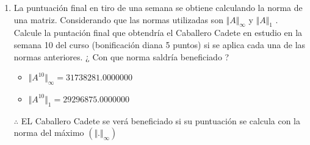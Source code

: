 \documentclass[10pt,a4paper]{article}
\begin{document}
\begin{enumerate}
	
	\item La puntuación final en tiro de una semana se obtiene calculando la norma de una matriz. Considerando que las normas utilizadas son $\Vert A\Vert_{\infty}$ y $\Vert A\Vert_{1}$ . Calcule la puntación final que obtendría el Caballero Cadete en estudio en la semana 10 del curso (bonificación diana 5 puntos) si se aplica cada una de las normas anteriores. ¿ Con que norma saldría beneficiado ?
		\begin{itemize}
			\item $\Vert A^{10}\Vert_{\infty} = 31738281.0000000$
			\item $\Vert A^{10}\Vert_{1} = 29296875.0000000$
		\end{itemize}
		$\therefore$ EL Caballero Cadete se verá beneficiado si su puntuación se calcula con la norma del máximo $(\Vert .\Vert_{\infty})$
\end{enumerate}









    
\end{document}
